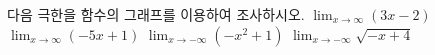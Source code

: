 다음 극한을 함수의 그래프를 이용하여 조사하시오.
 $\displaystyle\lim_{x\to\infty}(3x-2)$
 $\displaystyle\lim_{x\to\infty}(-5x+1)$
 $\displaystyle\lim_{x\to -\infty}(-x^2+1)$
 $\displaystyle\lim_{x\to -\infty}\sqrt{-x+4}$
